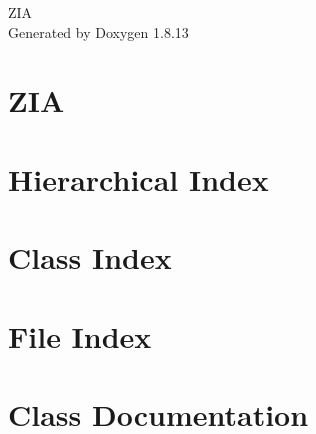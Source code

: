 \documentclass[twoside]{book}
\newcommand{\+}{\discretionary{\mbox{\scriptsize$\hookleftarrow$}}{}{}}
\newcommand{\clearemptydoublepage}{%
  \newpage{\pagestyle{empty}\cleardoublepage}%
}
\begin{document}
\hypersetup{pageanchor=false,
             bookmarksnumbered=true,
             pdfencoding=unicode
            }
\begin{titlepage}
\vspace*{7cm}
\begin{center}%
{\Large Z\+IA }\\
\vspace*{1cm}
{\large Generated by Doxygen 1.8.13}\\
\end{center}
\end{titlepage}
\clearemptydoublepage
{}
\tableofcontents
\clearemptydoublepage
{}
\hypersetup{pageanchor=true}

\chapter{Z\+IA}
\label{md_README}

\chapter{Hierarchical Index}

\chapter{Class Index}

\chapter{File Index}

\chapter{Class Documentation}



























\end{document}
